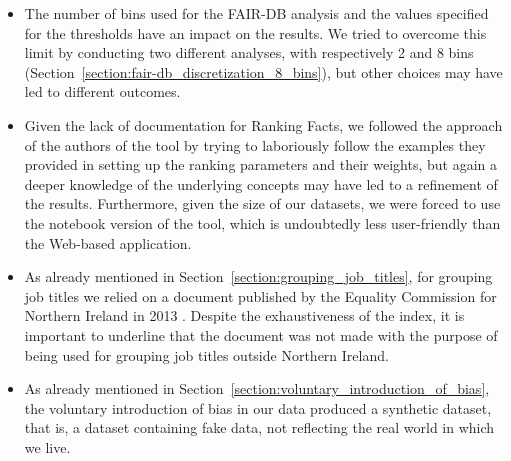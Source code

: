 \begin{itemize}
\item The number of bins used for the FAIR-DB analysis and the values specified for the thresholds have an impact on the results. We tried to overcome this limit by conducting two different analyses, with respectively 2 and 8 bins (Section~\ref{section:fair-db_discretization_8_bins}), but other choices may have led to different outcomes.
\item Given the lack of documentation for Ranking Facts, we followed the approach of the authors of the tool by trying to laboriously follow the examples they provided in setting up the ranking parameters and their weights, but again a deeper knowledge of the underlying concepts may have led to a refinement of the results. Furthermore, given the size of our datasets, we were forced to use the notebook version of the tool, which is undoubtedly less user-friendly than the Web-based application.
\item As already mentioned in Section~\ref{section:grouping_job_titles}, for grouping job titles we relied on a document published by the Equality Commission for Northern Ireland in 2013 \cite{equality2013index}. Despite the exhaustiveness of the index, it is important to underline that the document was not made with the purpose of being used for grouping job titles outside Northern Ireland.
\item As already mentioned in Section~\ref{section:voluntary_introduction_of_bias}, the voluntary introduction of bias in our data produced a synthetic dataset, that is, a dataset containing fake data, not reflecting the real world in which we live.
\end{itemize}
